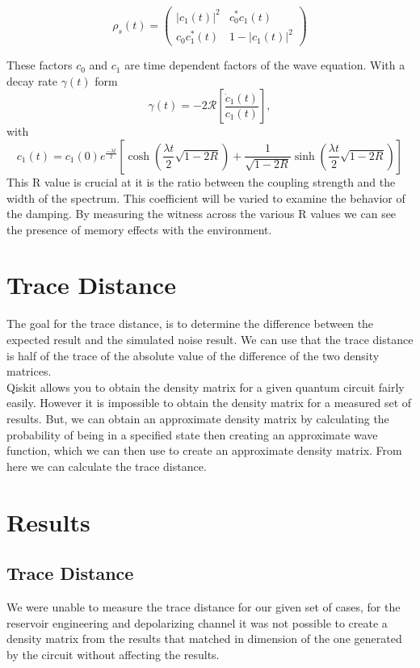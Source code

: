 \documentclass[12pt]{article}
\begin{document}
  \begin{equation}
    \rho_{s}(t) = \begin{pmatrix}
        \lvert c_{1}(t)\rvert^2 & c_{0}^{*}c_{1}(t) \\
        c_{0}c_{1}^{*}(t) & 1 - \lvert c_{1}(t)\rvert^2 
    \end{pmatrix}
  \end{equation}

  These factors $c_{0}$ and $c_{1}$ are time dependent factors of the wave equation. With a decay rate $\gamma(t)$ form
  \begin{equation}
    \gamma(t) = -2\mathcal{R} \left[ \frac{\dot{c}_{1}(t)}{c_{1}(t)} \right],
  \end{equation}
  with 
  \begin{equation}
    c_{1}(t) = c_{1}(0)e^{\frac{-\lambda t}{2}} \left[ \cosh (\frac{\lambda t}{2} \sqrt{1 - 2R}) + \frac{1}{\sqrt{1 - 2R}} \sinh (\frac{\lambda t}{2} \sqrt{1 - 2R}) \right]
  \end{equation}
  This R value is crucial at it is the ratio between the coupling strength and the width of the spectrum. This coefficient will be varied to examine the behavior of the damping. By measuring the witness across the various R values we can see the presence of memory effects with the environment.


\section{Trace Distance}
        The goal for the trace distance, is to determine the difference between the expected result and the simulated noise result. We can use that the trace distance is half of the trace of the absolute value of the difference of the two density matrices. \\
        Qiskit allows you to obtain the density matrix for a given quantum circuit fairly easily. However it is impossible to obtain the density matrix for a measured set of results. But, we can obtain an approximate density matrix by calculating the probability of being in a specified state then creating an approximate wave function, which we can then use to create an approximate density matrix. From here we can calculate the trace distance.  

  \section{Results}
  \subsection{Trace Distance}
        We were unable to measure the trace distance for our given set of cases, for the reservoir engineering and depolarizing channel it was not possible to create a density matrix from the results that matched in dimension of the one generated by the circuit without affecting the results.
\end{document}
